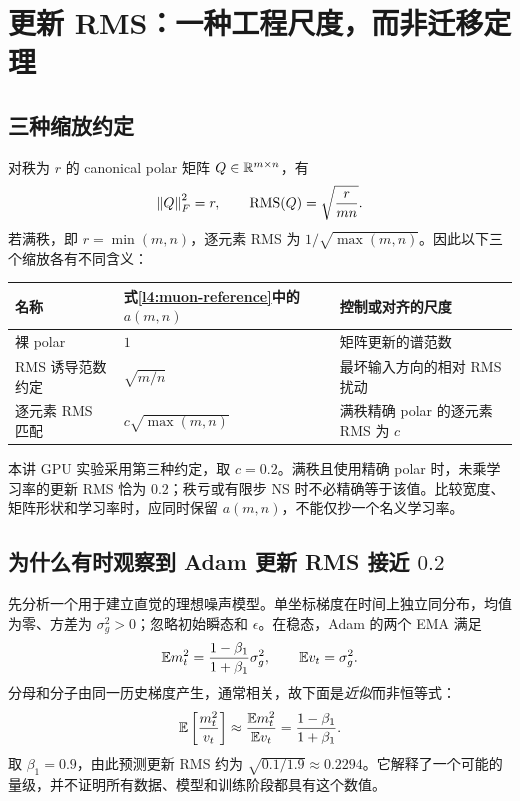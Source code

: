 \section{更新 RMS：一种工程尺度，而非迁移定理}
\label{l4:rms-matching}

\subsection{三种缩放约定}

对秩为 $r$ 的 canonical polar 矩阵 $Q\in\mathbb R^{m\times n}$，有
\begin{equation}
 \left\lVert Q\right\rVert_F^2=r,
 \qquad\operatorname{RMS}(Q)=\sqrt{\frac{r}{mn}}.
 \label{l4:polar-rms}
\end{equation}
若满秩，即 $r=\min(m,n)$，逐元素 RMS 为 $1/\sqrt{\max(m,n)}$。因此以下三个缩放各有不同含义：
\begin{center}
\small
\begin{tabularx}{\textwidth}{lXX}
\toprule
名称 & 式\eqref{l4:muon-reference}中的 $a(m,n)$ & 控制或对齐的尺度\\
\midrule
裸 polar & $1$ & 矩阵更新的谱范数\\
RMS 诱导范数约定 & $\sqrt{m/n}$ & 最坏输入方向的相对 RMS 扰动\\
逐元素 RMS 匹配 & $c\sqrt{\max(m,n)}$ & 满秩精确 polar 的逐元素 RMS 为 $c$\\
\bottomrule
\end{tabularx}
\end{center}
本讲 GPU 实验采用第三种约定，取 $c=0.2$。满秩且使用精确 polar 时，未乘学习率的更新 RMS 恰为 $0.2$；秩亏或有限步 NS 时不必精确等于该值。比较宽度、矩阵形状和学习率时，应同时保留 $a(m,n)$，不能仅抄一个名义学习率。

\subsection{为什么有时观察到 Adam 更新 RMS 接近 $0.2$}

先分析一个用于建立直觉的理想噪声模型。单坐标梯度在时间上独立同分布，均值为零、方差为 $\sigma_g^2>0$；忽略初始瞬态和 $\epsilon$。在稳态，Adam 的两个 EMA 满足
\begin{equation}
 \mathbb E m_t^2=\frac{1-\beta_1}{1+\beta_1}\sigma_g^2,
 \qquad \mathbb E v_t=\sigma_g^2.
 \label{l4:adam-moment-rms}
\end{equation}
分母和分子由同一历史梯度产生，通常相关，故下面是\emph{近似}而非恒等式：
\begin{equation}
 \mathbb E\left[\frac{m_t^2}{v_t}\right]
 \approx\frac{\mathbb E m_t^2}{\mathbb E v_t}
 =\frac{1-\beta_1}{1+\beta_1}.
 \label{l4:mean-field-rms}
\end{equation}
取 $\beta_1=0.9$，由此预测更新 RMS 约为
$\sqrt{0.1/1.9}\approx0.2294$。它解释了一个可能的量级，并不证明所有数据、模型和训练阶段都具有这个数值。

